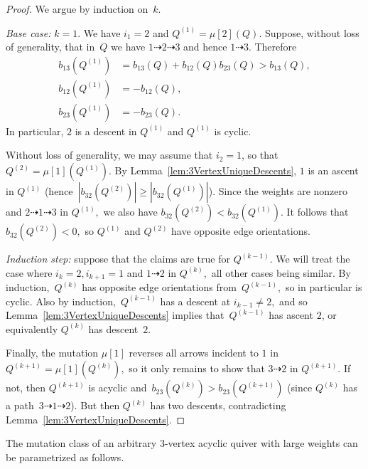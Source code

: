 \documentclass[11pt, letterpaper]{amsart}
\theoremstyle{definition}
\numberwithin{equation}{section}
\newcommand{\points}{\!\dasharrow\!}
\begin{document}
\begin{proof}
We argue by induction on~$k$. 

\emph{Base case:} $k=1$.
We have $i_1=2$ and $Q^{(1)} = \mu[2](Q).$ 
Suppose, without loss of generality, that in~$Q$ we have $1 \points 2 \points 3$ and hence $1 \points 3.$ 
Therefore
\begin{align*}
b_{13}(Q^{(1)}) &= b_{13}(Q) + b_{12}(Q) b_{23}(Q) > b_{13}(Q), \\
b_{12}(Q^{(1)}) &= - b_{12}(Q), \\
b_{23}(Q^{(1)}) &= - b_{23}(Q).
\end{align*}
In particular, $2$ is a descent in $Q^{(1)}$ and $Q^{(1)}$ is cyclic. 

Without loss of generality, we may assume that $i_2=1$, so that $Q^{(2)}= \mu[1](Q^{(1)})$. 
By Lemma~\ref{lem:3VertexUniqueDescents}, $1$ is an ascent in $Q^{(1)}$ (hence~$|b_{32}(Q^{(2)})| \geq |b_{32}(Q^{(1)})|$). 
Since the weights are nonzero and $2 \points 1 \points 3$ in $Q^{(1)},$ we also have $b_{32}(Q^{(2)}) < b_{32}(Q^{(1)})$. 
It follows that $b_{32}(Q^{(2)}) < 0,$ so $Q^{(1)}$ and $Q^{(2)}$ have opposite edge orientations. 

\emph{Induction step:} 
suppose that the claims are true for $Q^{(k-1)}.$ 
We will treat the case where $i_k = 2, i_{k+1}=1$ and $1 \points 2$ in $Q^{(k)},$ all other cases being similar. 
By induction,~$Q^{(k)}$ has opposite edge orientations from~$Q^{(k-1)},$ so in particular is cyclic. 
Also by induction,~$Q^{(k-1)}$ has a descent at $i_{k-1} \neq 2,$ and so Lemma~\ref{lem:3VertexUniqueDescents} implies that~$Q^{(k-1)}$
 has ascent $2$, or equivalently $Q^{(k)}$ has descent~$2$. 

Finally, the mutation $\mu[1]$ reverses all arrows incident to $1$ in $Q^{(k+1)} = \mu[1](Q^{(k)}),$ 
so it only remains to show that $3 \points 2$ in $Q^{(k+1)}.$ 
If not, then $Q^{(k+1)}$ is acyclic and~${b_{23}(Q^{(k)}) > b_{23}(Q^{(k+1)})}$ (since $Q^{(k)}$ has a path~$3 \points 1 \points 2$). 
But then $Q^{(k)}$ has two descents, contradicting Lemma~\ref{lem:3VertexUniqueDescents}.
\end{proof}

\pagebreak[3]

The mutation class of an arbitrary 3-vertex acyclic quiver with large weights can be parametrized as follows. 
\end{document}
